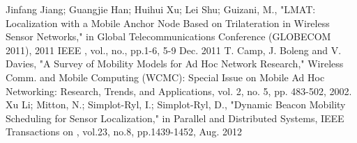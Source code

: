 \documentclass[conference]{IEEEtran}
\begin{document}
\begin{thebibliography}{1}
Jinfang Jiang; Guangjie Han; Huihui Xu; Lei Shu; Guizani, M., "LMAT: Localization with a Mobile Anchor Node Based on Trilateration in Wireless Sensor Networks," in Global Telecommunications Conference (GLOBECOM 2011), 2011 IEEE , vol., no., pp.1-6, 5-9 Dec. 2011
T. Camp, J. Boleng and V. Davies, "A Survey of Mobility Models for Ad Hoc Network Research," Wireless Comm. and Mobile Computing (WCMC): Special Issue on Mobile Ad Hoc Networking: Research, Trends, and Applications, vol. 2, no. 5, pp. 483-502, 2002. 
Xu Li; Mitton, N.; Simplot-Ryl, I.; Simplot-Ryl, D., "Dynamic Beacon Mobility Scheduling for Sensor Localization," in Parallel and Distributed Systems, IEEE Transactions on , vol.23, no.8, pp.1439-1452, Aug. 2012


\end{thebibliography}

% 








\end{document}
